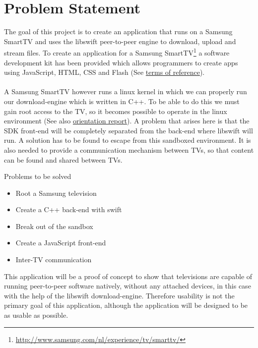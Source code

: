 \chapter{Problem Statement}
\label{sec:problems}
The goal of this project is to create an application that runs on a Samsung SmartTV and uses the libswift peer-to-peer engine to download, upload and stream files. To create an application for a Samsung SmartTV\footnote{\url{http://www.samsung.com/nl/experience/tv/smarttv/}} a software development kit has been provided which allows programmers to create apps using JavaScript, HTML, CSS and Flash (See \hyperref[sec:terms]{terms of reference}).\\\\
A Samsung SmartTV however runs a linux kernel in which we can properly run our download-engine which is written in C++. To be able to do this we must gain root access to the TV, so it becomes possible to operate in the linux environment (See also \hyperref[sec:orientation]{orientation report}). A problem that arises here is that the SDK front-end will be completely separated from the back-end where libswift will run. A solution has to be found to escape from this sandboxed environment. It is also needed to provide a communication mechanism between TV\textquotesingle s,
so that content can be found and shared between TV\textquotesingle s.

Problems to be solved
\begin{itemize}
\item Root a Samsung television
\item Create a C++ back-end with swift
\item Break out of the sandbox
\item Create a JavaScript front-end
\item Inter-TV communication
\end{itemize}

This application will be a proof of concept to show that televisions are capable of running peer-to-peer software natively, without any attached
devices, in this case with the help of the libswift download-engine. Therefore usability is not the primary goal of this application, 
although the application will be designed to be as usable as possible.
